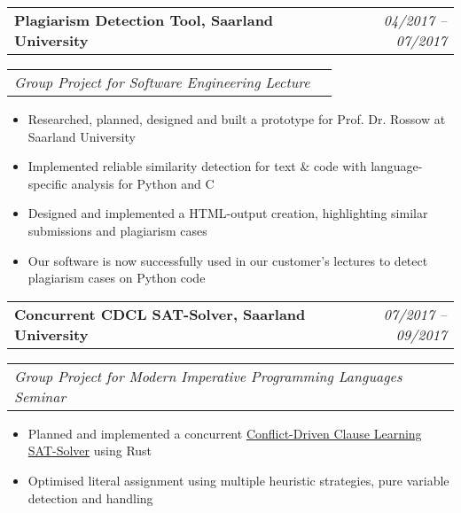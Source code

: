 \documentclass[10pt,letterpaper]{article}
\makeatletter
\newcommand{\headerrow}[2]
{\begin{tabular*}{\linewidth}{l@{\extracolsep{\fill}}r}
	#1 &
	#2 \\
\end{tabular*}}
\makeatother
\begin{document}
\noindent
\headerrow{\textbf{Plagiarism Detection Tool, Saarland University}}{\emph{04/2017 -- 07/2017}}
\headerrow{\emph{Group Project for Software Engineering Lecture}}{}
\vspace{-1.6em}
\begin{itemize}
    \setlength\itemsep{0em}
    \item Researched, planned, designed and built a prototype for Prof. Dr. Rossow at Saarland University
    \item Implemented reliable similarity detection for text \& code with language-specific analysis for Python and C
    \item Designed and implemented a HTML-output creation, highlighting similar submissions and plagiarism cases
    \item Our software is now successfully used in our customer's lectures to detect plagiarism cases on Python code
\end{itemize}

% 
\noindent
\headerrow{\textbf{Concurrent CDCL SAT-Solver, Saarland University}}{\emph{07/2017 -- 09/2017}}
\headerrow{\emph{Group Project for Modern Imperative Programming Languages Seminar}}{}
\vspace{-1.6em}
\begin{itemize}
    \setlength\itemsep{0em}
    \item Planned and implemented a concurrent \href{https://www.researchgate.net/publication/255409904_Conflict-Driven_Clause_Learning_SAT_Solvers}{Conflict-Driven Clause Learning SAT-Solver} using Rust
    \item Optimised literal assignment using multiple heuristic strategies, pure variable detection and handling
\end{itemize}
% 
% 
% 
\end{document}
